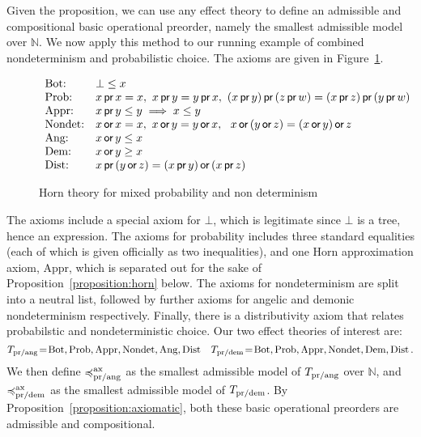 Given the proposition, we can use any effect theory to define an admissible and compositional basic operational preorder, namely the smallest admissible model over $\mathbb{N}$. We now apply this method to our running example of combined nondeterminism and probabilistic choice. The  axioms are given in
Figure~\ref{fig:axiomsmixed}.
\begin{figure}[t]
\[
\begin{array}{ll}
\text{Bot:} & \bot \leq x
\\
\text{Prob:} & x \operatorname{\textsf{pr}} x = x , ~ x \operatorname{\textsf{pr}} y = y \operatorname{\textsf{pr}} x , ~ 
                                (x \operatorname{\textsf{pr}} y) \operatorname{\textsf{pr}}\, (z \operatorname{\textsf{pr}} w) = (x \operatorname{\textsf{pr}} z) \operatorname{\textsf{pr}}\, (y \operatorname{\textsf{pr}} w)
\\
\text{Appr:} & x \operatorname{\textsf{pr}} y \leq y \implies  x \leq y
 \\
\text{Nondet:} & x \operatorname{\textsf{or}} x = x, ~ x \operatorname{\textsf{or}} y = y \operatorname{\textsf{or}} x, ~ ~ x \operatorname{\textsf{or}}\, (y \operatorname{\textsf{or}} z) = (x \operatorname{\textsf{or}} y) \operatorname{\textsf{or}} z
\\
\text{Ang:} & x \operatorname{\textsf{or}} y \leq x \\ 
\text{Dem:} & x \operatorname{\textsf{or}} y \geq x \\ 
\text{Dist:} & x \operatorname{\textsf{pr}}\, (y \operatorname{\textsf{or}} z) = (x \operatorname{\textsf{pr}} y) \operatorname{\textsf{or}}\, (x \operatorname{\textsf{pr}} z)
\end{array}
\]
    \caption{Horn theory for mixed probability and non determinism}
    \label{fig:axiomsmixed}
\end{figure}

The axioms include a special axiom for $\bot$, which is legitimate since $\bot$ is a tree, hence an expression.
The axioms  for probability includes three standard equalities (each of which is given officially as two inequalities), and one Horn approximation axiom, $\text{Appr}$, which  is separated out for the sake of Proposition~\ref{proposition:horn} below.
The axioms for nondeterminism are split into a neutral list,  followed by further axioms  for angelic and demonic nondeterminism respectively. Finally, there is a distributivity axiom that relates
probabilstic and nondeterministic choice. 
Our two effect theories of interest are: 
\[
T_{\text{pr/ang}} \!=\!  \text{Bot},  \text{Prob},  \text{Appr}, \text{Nondet}, \text{Ang},\text{Dist} \quad
T_{\text{pr/dem}}\! = \!\text{Bot},  \text{Prob},  \text{Appr},  \text{Nondet},  \text{Dem},\text{Dist}\,.
\]
We then define  $\preccurlyeq^{\text{ax}}_{\text{pr/ang}}$ as the smallest admissible model
of $T_{\text{pr/ang}}$ over $\mathbb{N}$, and 
$\preccurlyeq^{\text{ax}}_{\text{pr/dem}}$ as the smallest admissible model
of $T_{\text{pr/dem}}$. By Proposition~\ref{proposition:axiomatic}, both these basic operational preorders are admissible and compositional.

